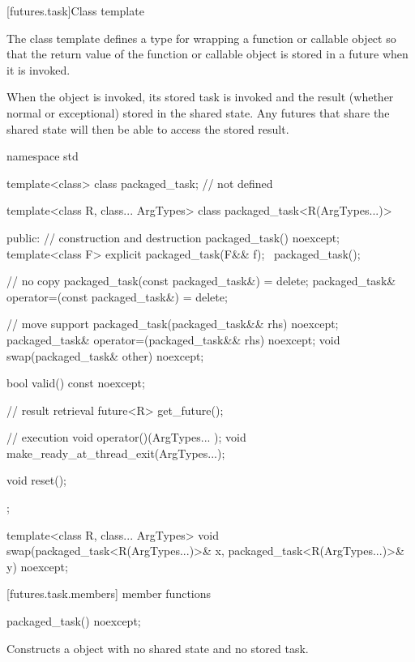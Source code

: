 [futures.task]{Class template }

\pnum
The class template  defines a type for wrapping a function or
callable object so that the return value of the function or callable object is stored in
a future when it is invoked.

\pnum
When the  object is invoked, its stored task is invoked and the
result (whether normal or exceptional) stored in the shared state. Any futures that
share the shared state will then be able to access the stored result.

%
\begin{codeblock}
namespace std {
  template<class> class packaged_task; // not defined

  template<class R, class... ArgTypes>
  class packaged_task<R(ArgTypes...)> {
  public:
    // construction and destruction
    packaged_task() noexcept;
    template<class F>
      explicit packaged_task(F&& f);
    ~packaged_task();

    // no copy
    packaged_task(const packaged_task&) = delete;
    packaged_task& operator=(const packaged_task&) = delete;

    // move support
    packaged_task(packaged_task&& rhs) noexcept;
    packaged_task& operator=(packaged_task&& rhs) noexcept;
    void swap(packaged_task& other) noexcept;

    bool valid() const noexcept;

    // result retrieval
    future<R> get_future();

    // execution
    void operator()(ArgTypes... );
    void make_ready_at_thread_exit(ArgTypes...);

    void reset();
  };

  template<class R, class... ArgTypes>
    void swap(packaged_task<R(ArgTypes...)>& x, packaged_task<R(ArgTypes...)>& y) noexcept;
}
\end{codeblock}

[futures.task.members]{ member functions}

%
\begin{itemdecl}
packaged_task() noexcept;
\end{itemdecl}

\begin{itemdescr}
\pnum
\effects Constructs a  object with no shared state and no stored task.
\end{itemdescr}

